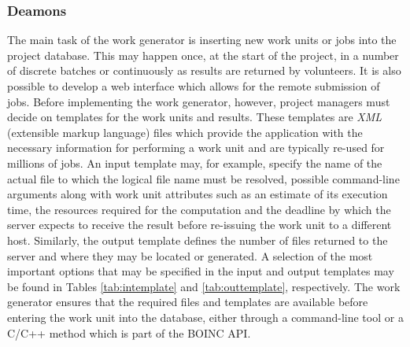 \subsubsection{Deamons} \label{Bdeamons}
The main task of the work generator is inserting new work units or jobs into the project database. This may happen once, at the start of the project, in a number of discrete batches or continuously as results are returned by volunteers. It is also possible to develop a web interface which allows for the remote submission of jobs.
Before implementing the work generator, however, project managers must decide on templates for the work units and results. These templates are \emph{XML} (extensible markup language) files which provide  the application with the necessary information for performing a work unit and are typically re-used for millions of jobs. 
An input template may, for example, specify the name of the actual file to which the logical file name must be resolved, possible command-line arguments along with work unit attributes such as an estimate of its execution time, the resources required for the computation and the deadline by which the server expects to receive the result before re-issuing the work unit to a different host.  
Similarly, the output template defines the number of files returned to the server and where they may be located  or generated. A selection of the most important options that may be specified in the input and output templates may be found in Tables \ref{tab:intemplate} and \ref{tab:outtemplate}, respectively. The work generator ensures that the required files and templates are available before entering the work unit into the database, either through a command-line tool or  a C/C++ method which is part of the BOINC API.
